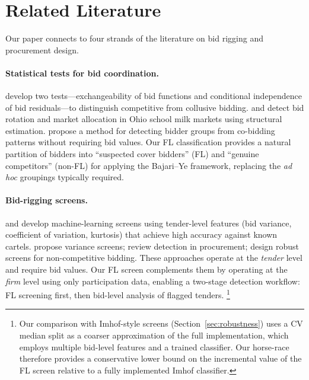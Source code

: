 \section{Related Literature}
\label{sec:literature}

Our paper connects to four strands of the literature on bid rigging and
procurement design.

\paragraph{Statistical tests for bid coordination.}
\citet{bajari2003deciding} develop two tests---exchangeability of bid
functions and conditional independence of bid residuals---to distinguish
competitive from collusive bidding. \citet{porter1993detection} and
\citet{porter1999ohio} detect bid rotation and market allocation in Ohio
school milk markets using structural estimation.
\citet{conley2016detecting} propose a method for detecting bidder groups
from co-bidding patterns without requiring bid values. Our FL
classification provides a natural partition of bidders into ``suspected
cover bidders'' (FL) and ``genuine competitors'' (non-FL) for applying
the Bajari--Ye framework, replacing the \emph{ad hoc} groupings
typically required.

\paragraph{Bid-rigging screens.}
\citet{imhof2019detecting} and \citet{imhof2018screening} develop
machine-learning screens using tender-level features (bid variance,
coefficient of variation, kurtosis) that achieve high accuracy against
known cartels. \citet{abrantesmetz2006a} propose variance screens;
\citet{hüschelrath2014cartel} review detection in procurement;
\citet{chassang2022robust} design robust screens for non-competitive
bidding. These approaches operate at the \emph{tender} level and require
bid values. Our FL screen complements them by operating at the
\emph{firm} level using only participation data, enabling a two-stage
detection workflow: FL screening first, then bid-level analysis of
flagged tenders.%
\footnote{Our comparison with Imhof-style screens %
(Section~\ref{sec:robustness}) uses a CV median split as a coarser
approximation of the full \citet{imhof2019detecting} implementation,
which employs multiple bid-level features and a trained classifier. Our
horse-race therefore provides a conservative lower bound on the
incremental value of the FL screen relative to a fully implemented Imhof
classifier.}

